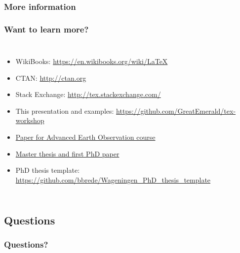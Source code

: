 \documentclass[xetex,colorlinks]{beamer} %
\begin{document}
  \subsubsection{More information}
  \begin{frame}
    \frametitle{Want to learn more?}
    \begin{columns}
      \begin{itemize}
	\item WikiBooks: \href{https://en.wikibooks.org/wiki/LaTeX}{https://en.wikibooks.org/wiki/LaTeX}
	\item CTAN: \href{http://ctan.org}{http://ctan.org}
	\item Stack Exchange: \href{http://tex.stackexchange.com/}{http://tex.stackexchange.com/}
	\item This presentation and examples: \href{https://github.com/GreatEmerald/tex-workshop}{https://github.com/GreatEmerald/tex-workshop}
	\item \href{https://github.com/GreatEmerald/AEO-validation-paper/tree/master/paper}{Paper for Advanced Earth Observation course}
	\item \href{https://github.com/GreatEmerald/master-classification/tree/master/thesis}{Master thesis and first PhD paper}
	\item PhD thesis template: \href{https://github.com/bbrede/Wageningen\_PhD\_thesis\_template}{https://github.com/bbrede/Wageningen\_PhD\_thesis\_template}
      \end{itemize}
      
    \end{columns}
  \end{frame}
  
  \subsection{Questions}
  \begin{frame}
    \frametitle{Questions?}
    \tableofcontents[sectionstyle=shaded/show,subsectionstyle=shaded/shaded/show,subsubsectionstyle=shaded/shaded/shaded/show]
  \end{frame}

  
\end{document}
